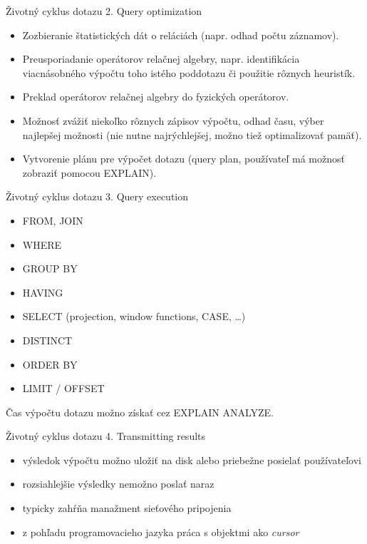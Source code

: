 \documentclass[12pt]{beamer}
\begin{document}
\begin{frame}[fragile]{Životný cyklus dotazu}
2. Query optimization
\begin{itemize}
  \item Zozbieranie štatistických dát o reláciách (napr. odhad počtu záznamov).
  \item Preusporiadanie operátorov relačnej algebry,
      napr. identifikácia viacnásobného výpočtu toho istého poddotazu či použitie rôznych heuristík.
  \item Preklad operátorov relačnej algebry do fyzických operátorov.
  \item Možnosť zvážiť niekoľko rôznych zápisov výpočtu, odhad času, výber najlepšej možnosti
      (nie nutne najrýchlejšej, možno tiež optimalizovať pamäť).
  \item Vytvorenie plánu pre výpočet dotazu (query plan, používateľ má možnosť zobraziť pomocou EXPLAIN).
\end{itemize}
\end{frame}

\begin{frame}[fragile]{Životný cyklus dotazu}
3. Query execution
\begin{itemize}
  \item FROM, JOIN
  \item WHERE
  \item GROUP BY
  \item HAVING
  \item SELECT (projection, window functions, CASE, \dots)
  \item DISTINCT
  \item ORDER BY
  \item LIMIT / OFFSET
\end{itemize}
Čas výpočtu dotazu možno získať cez EXPLAIN ANALYZE.
\end{frame}

\begin{frame}[fragile]{Životný cyklus dotazu}
4. Transmitting results
\begin{itemize}
  \item výsledok výpočtu možno uložiť na disk alebo priebežne posielať používateľovi
  \item rozsiahlejšie výsledky nemožno poslať naraz
  \item typicky zahŕňa manažment sieťového pripojenia
  \item z pohľadu programovacieho jazyka práca s objektmi ako \emph{cursor}
\end{itemize}
\end{frame}
\end{document}
